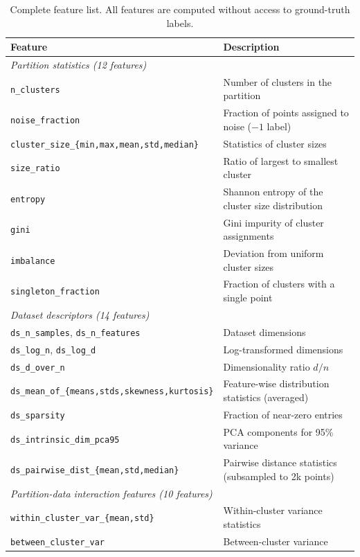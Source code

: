 \documentclass[10pt]{article} %
\begin{document}
\begin{table}[h]
\centering
\caption{Complete feature list. All features are computed without access to ground-truth labels.}
\label{tab:app_features}
\small
\begin{tabular}{lp{7cm}}
\toprule
\textbf{Feature} & \textbf{Description} \\
\midrule
\multicolumn{2}{l}{\textit{Partition statistics (12 features)}} \\
\texttt{n\_clusters} & Number of clusters in the partition \\
\texttt{noise\_fraction} & Fraction of points assigned to noise ($-1$ label) \\
\texttt{cluster\_size\_\{min,max,mean,std,median\}} & Statistics of cluster sizes \\
\texttt{size\_ratio} & Ratio of largest to smallest cluster \\
\texttt{entropy} & Shannon entropy of the cluster size distribution \\
\texttt{gini} & Gini impurity of cluster assignments \\
\texttt{imbalance} & Deviation from uniform cluster sizes \\
\texttt{singleton\_fraction} & Fraction of clusters with a single point \\
\midrule
\multicolumn{2}{l}{\textit{Dataset descriptors (14 features)}} \\
\texttt{ds\_n\_samples}, \texttt{ds\_n\_features} & Dataset dimensions \\
\texttt{ds\_log\_n}, \texttt{ds\_log\_d} & Log-transformed dimensions \\
\texttt{ds\_d\_over\_n} & Dimensionality ratio $d/n$ \\
\texttt{ds\_mean\_of\_\{means,stds,skewness,kurtosis\}} & Feature-wise distribution statistics (averaged) \\
\texttt{ds\_sparsity} & Fraction of near-zero entries \\
\texttt{ds\_intrinsic\_dim\_pca95} & PCA components for 95\% variance \\
\texttt{ds\_pairwise\_dist\_\{mean,std,median\}} & Pairwise distance statistics (subsampled to 2k points) \\
\midrule
\multicolumn{2}{l}{\textit{Partition-data interaction features (10 features)}} \\
\texttt{within\_cluster\_var\_\{mean,std\}} & Within-cluster variance statistics \\
\texttt{between\_cluster\_var} & Between-cluster variance \\

\end{tabular}
\end{table}
\end{document}
